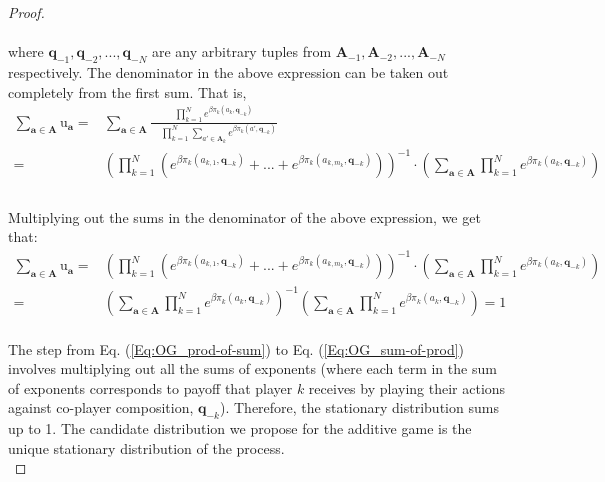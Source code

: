 \documentclass[11pt]{article}
\theoremstyle{plainCl1}
\theoremstyle{plainCl2}
\newcommand{\A}{\mathbf{A}}
\newcommand{\abf}{\mathbf{a}}
\newcommand{\qbf}{\mathbf{q}}
\begin{document}
\begin{proof}
\noindent \\ \\ where $\qbf_{-1}, \qbf_{-2},...,\qbf_{-N}$ are any arbitrary tuples from $\A_{-1}, \A_{-2},...,\A_{-N}$ respectively. The denominator in the above expression can be taken out completely from the first sum. That is, \\
\begin{align}
\sum_{\abf \in \A} \mathrm{u}_\abf = &\sum_{\abf \in \A} \frac{\displaystyle \prod_{k=1}^N e^{\beta \pi_k(a_k, \qbf_{-k})}}{\displaystyle \quad \prod_{k=1}^N \sum_{a' \in \A_k} e^{\beta \pi_k(a',\qbf_{-k})}} \\[15pt]
=& \left( \displaystyle \prod_{k=1}^N \left( e^{\beta \pi_k(a_{k,1}, \qbf_{-k})}+... + e^{\beta \pi_k(a_{k,m_k}, \qbf_{-k})} \right) \right)^{-1} \cdot \left( \sum_{\abf \in \A} \displaystyle \prod_{k=1}^N e^{\beta \pi_k(a_k, \qbf_{-k})} \right) \\
\end{align} \\
\noindent Multiplying out the sums in the denominator of the above expression, we get that:
\begin{align}
\label{Eq:OG_prod-of-sum}
\sum_{\abf \in \A} \mathrm{u}_\abf =& \left( \displaystyle \prod_{k=1}^N \left( e^{\beta \pi_k(a_{k,1}, \qbf_{-k})}+... + e^{\beta \pi_k(a_{k,m_k}, \qbf_{-k})} \right) \right)^{-1} \cdot \left( \sum_{\abf \in \A} \displaystyle \prod_{k=1}^N e^{\beta \pi_k(a_k, \qbf_{-k})} \right) \\[10pt]
\label{Eq:OG_sum-of-prod}
=& \left( \sum_{\abf \in \A} \displaystyle \prod_{k=1}^N e^{\beta \pi_k(a_k, \qbf_{-k})}  \right)^{-1} \left( \sum_{\abf \in \A} \displaystyle \prod_{k=1}^N e^{\beta \pi_k(a_k, \qbf_{-k})}  \right) = 1
\end{align} \\ 
\noindent The step from Eq. (\ref{Eq:OG_prod-of-sum}) to Eq. (\ref{Eq:OG_sum-of-prod}) involves multiplying out all the sums of exponents (where each term in the sum of exponents corresponds to payoff that player $k$ receives by playing their actions against co-player composition, $\qbf_{-k}$). Therefore, the stationary distribution sums up to 1. The candidate distribution we propose for the additive game is the unique stationary distribution of the process.\\
\end{proof}
\end{document}
